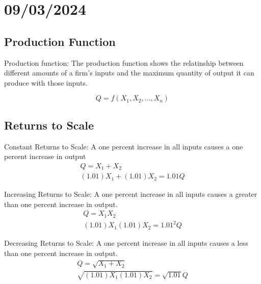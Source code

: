 \section{09/03/2024}
\subsection{Production Function}
Production function: The production function shows the relatinship between different amounts of a firm's inputs and the maximum quantity of output it can produce with those inputs.

\begin{equation}
  Q = f(X_1,X_2,\dots,X_n)
\end{equation}

\subsection{Returns to Scale} 

Constant Returns to Scale: A one percent increase in all inputs causes a one percent increase in output
\begin{gather}
  Q = X_1+X_2 \\
  (1.01)X_1 + (1.01)X_2 = 1.01 Q 
\end{gather}

Increasing Returns to Scale: A one percent increase in all inputs causes a greater than one percent increase in output.
\begin{gather}
  Q = X_1X_2 \\
  (1.01)X_1(1.01)X_2 = 1.01^2 Q 
\end{gather}

Decreasing Returns to Scale: A one percent increase in all inputs causes a less than one percent increase in output.
\begin{gather}
  Q = \sqrt{X_1+X_2}  \\
  \sqrt{(1.01)X_1(1.01)X_2} = \sqrt{1.01} Q 
\end{gather}

